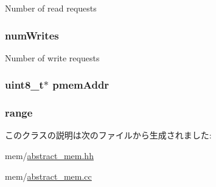 \label{classAbstractMemory_a27f442fbcb7bc7661412cc1d96ca51e7}
Number of read requests \hypertarget{classAbstractMemory_acfd6a97aa6c2de05417a7403369e71c2}{
\subsubsection[{numWrites}]{ {\bf numWrites}}}
\label{classAbstractMemory_acfd6a97aa6c2de05417a7403369e71c2}
Number of write requests \hypertarget{classAbstractMemory_a9f8ed24d8442f662831d51922e7fddd2}{
\subsubsection[{pmemAddr}]{\setlength{\rightskip}{0pt plus 5cm}uint8\_\-t$\ast$ {\bf pmemAddr}}}
\label{classAbstractMemory_a9f8ed24d8442f662831d51922e7fddd2}
\hypertarget{classAbstractMemory_a194876a072a83a9fd59dde82e5213f0d}{
\subsubsection[{range}]{ {\bf range}}}
\label{classAbstractMemory_a194876a072a83a9fd59dde82e5213f0d}


このクラスの説明は次のファイルから生成されました:\begin{DoxyCompactItemize}
\item 
mem/\hyperlink{abstract__mem_8hh}{abstract\_\-mem.hh}\item 
mem/\hyperlink{abstract__mem_8cc}{abstract\_\-mem.cc}\end{DoxyCompactItemize}
